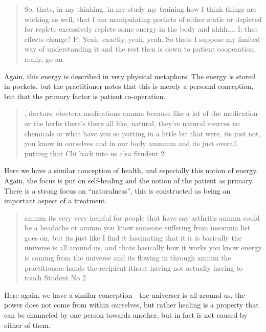 \begin{quotation}
  So, thats, in my thinking, in my study my training how I think things are working as well, that I am manipulating pockets of either static or depleted for replete excessively replete some energy in the body and ahhh....
I: that effects change?
P: Yeah, exactly, yeah, yeah. So thats I suppose my limited way of understanding it and the rest then is down to patient cooperation, really, go an

\end{quotation}

Again, this energy is described in very physical metaphors. The energy is stored in pockets, but the practitioner notes that this is merely a personal conception, but that the primary factor is patient co-operation. 



  
\begin{quotation}
  , doctors, etcetera medications ammm because like a lot of the medication or the herbs there's there all like, natural, they're natural sources no chemicals or what have you so putting in a little bit that were, its just not, you know in ourselves and in our body ammmm and its just overall putting that Chi back into us also
Student 2
\end{quotation}

Here we have a similar conception of health, and especially this notion  of energy. Again, the focus is put on self-healing and the notion of the patient as primary. There is a strong focus on ``naturalness'', this is constructed as being an important aspect of a treatment. 

\begin{quotation}
  ammm its very very helpful for people that have say arthritis ammm could be a headache or ammm you know someone suffering from insomnia list goes on, but its just like I find it fascinating that it is is basically the universe is all around us, and thats basically how it works you know energy is coming from the universe and its flowing in through ammm the practitioners hands the recipient ithout having not actually having to touch 
Student No 2
\end{quotation}

Here again, we have a similar conception - the universer is all around us, the power does not come from within ourselves, but rather healing is a property that can be channeled by one person towards another, but in fact is not caused by either of them. 


